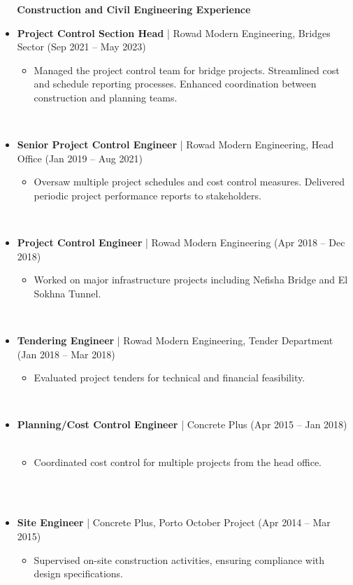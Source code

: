 \documentclass[10pt, letterpaper]{article}
\begin{document}
    \textbf{Construction and Civil Engineering Experience}
    \begin{itemize}[leftmargin=*]
        \item \textbf{Project Control Section Head} | Rowad Modern Engineering, Bridges Sector (Sep 2021 – May 2023)
        \begin{itemize}[leftmargin=1cm]
            \item Managed the project control team for bridge projects. Streamlined cost and schedule reporting processes. Enhanced coordination between construction and planning teams.
        \end{itemize}
        \item \textbf{Senior Project Control Engineer} | Rowad Modern Engineering, Head Office (Jan 2019 – Aug 2021)
        \begin{itemize}[leftmargin=1cm]
            \item Oversaw multiple project schedules and cost control measures. Delivered periodic project performance reports to stakeholders.
        \end{itemize}
        \item \textbf{Project Control Engineer} | Rowad Modern Engineering (Apr 2018 – Dec 2018)
        \begin{itemize}[leftmargin=1cm]
            \item Worked on major infrastructure projects including Nefisha Bridge and El Sokhna Tunnel.
        \end{itemize}
        \item \textbf{Tendering Engineer} | Rowad Modern Engineering, Tender Department (Jan 2018 – Mar 2018)
        \begin{itemize}[leftmargin=1cm]
            \item Evaluated project tenders for technical and financial feasibility.
        \end{itemize}
        \item \textbf{Planning/Cost Control Engineer} | Concrete Plus (Apr 2015 – Jan 2018)
        \begin{itemize}[leftmargin=1cm]
            \item Coordinated cost control for multiple projects from the head office.
        \end{itemize}
        \item \textbf{Site Engineer} | Concrete Plus, Porto October Project (Apr 2014 – Mar 2015)
        \begin{itemize}[leftmargin=1cm]
            \item Supervised on-site construction activities, ensuring compliance with design specifications.
        \end{itemize}
    \end{itemize}
\end{document}

